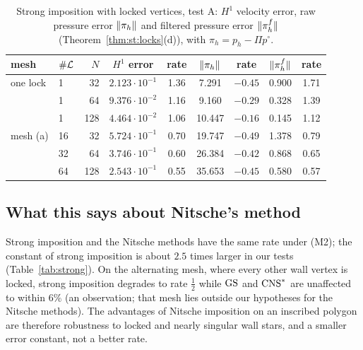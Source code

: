 \begin{table}[t]
\centering\small
\caption{Strong imposition with locked vertices, test A: $H^1$ velocity error, raw pressure error $\lVert \pi_h\rVert$ and filtered pressure error $\lVert \pi_h^f\rVert$ (Theorem~\ref{thm:st:locks}(d)), with $\pi_h=p_h-\Pi p^\circ$.}\label{tab:locks}
\begin{tabular}{llrcccccc}
\toprule
mesh & $\#\mathcal L$ & $N$ & $H^1$ error & rate & $\lVert \pi_h\rVert$ & rate & $\lVert \pi_h^f\rVert$ & rate\\
\midrule
one lock & 1 & 32 & $2.123\cdot10^{-1}$ & 1.36 & 7.291 & $-0.45$ & 0.900 & 1.71\\
 & 1 & 64 & $9.376\cdot10^{-2}$ & 1.16 & 9.160 & $-0.29$ & 0.328 & 1.39\\
 & 1 & 128 & $4.464\cdot10^{-2}$ & 1.06 & 10.447 & $-0.16$ & 0.145 & 1.12\\
mesh (a) & 16 & 32 & $5.724\cdot10^{-1}$ & 0.70 & 19.747 & $-0.49$ & 1.378 & 0.79\\
 & 32 & 64 & $3.746\cdot10^{-1}$ & 0.60 & 26.384 & $-0.42$ & 0.868 & 0.65\\
 & 64 & 128 & $2.543\cdot10^{-1}$ & 0.55 & 35.653 & $-0.45$ & 0.580 & 0.57\\
\bottomrule
\end{tabular}
\end{table}

\subsection{What this says about Nitsche's method}
Strong imposition and the Nitsche methods have the same rate under (M2); the constant of strong imposition is about $2.5$ times larger in our tests (Table~\ref{tab:strong}). On the alternating mesh, where every other wall vertex is locked, strong imposition degrades to rate $\frac12$ while $\mathrm{GS}$ and $\mathrm{CNS}^\ast$ are unaffected to within $6\%$ (an observation; that mesh lies outside our hypotheses for the Nitsche methods). The advantages of Nitsche imposition on an inscribed polygon are therefore robustness to locked and nearly singular wall stars, and a smaller error constant, not a better rate.
